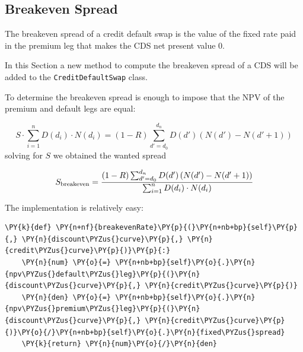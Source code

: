\subsection{Breakeven Spread}
The breakeven spread of a credit default swap is the value of the fixed rate paid in the premium leg that makes the CDS net present value 0.

In this Section a new method to compute the breakeven spread of a CDS will be added to the \texttt{CreditDefaultSwap} class.

To determine the breakeven spread is enough to impose that the NPV of the premium and default legs are equal:

\[
S \cdot\sum_{i=1}^{n} D(d_i) \cdot N(d_i)
= (1-R) \sum_{d'=d_0}^{d_n} D(d') \left( N(d') - N(d'+1) \right)
\]
solving for $S$ we obtained the wanted spread

\[
S_{\mathrm{breakeven}} = \cfrac{(1-R) \sum_{d'=d_0}^{d_n} D(d') \left( N(d') - N(d'+1) \right)}{\sum_{i=1}^{n} D(d_i) \cdot N(d_i)}
\]

The implementation is relatively easy:

\begin{tcolorbox}[breakable, size=fbox, boxrule=1pt, pad at break*=1mm,colback=cellbackground, colframe=cellborder]
\begin{Verbatim}[commandchars=\\\{\}]
  \PY{k}{def} \PY{n+nf}{breakevenRate}\PY{p}{(}\PY{n+nb+bp}{self}\PY{p}{,} \PY{n}{discount\PYZus{}curve}\PY{p}{,} \PY{n}{credit\PYZus{}curve}\PY{p}{)}\PY{p}{:}
    \PY{n}{num} \PY{o}{=} \PY{n+nb+bp}{self}\PY{o}{.}\PY{n}{npv\PYZus{}default\PYZus{}leg}\PY{p}{(}\PY{n}{discount\PYZus{}curve}\PY{p}{,} \PY{n}{credit\PYZus{}curve}\PY{p}{)}
    \PY{n}{den} \PY{o}{=} \PY{n+nb+bp}{self}\PY{o}{.}\PY{n}{npv\PYZus{}premium\PYZus{}leg}\PY{p}{(}\PY{n}{discount\PYZus{}curve}\PY{p}{,} \PY{n}{credit\PYZus{}curve}\PY{p}{)}\PY{o}{/}\PY{n+nb+bp}{self}\PY{o}{.}\PY{n}{fixed\PYZus{}spread}
    \PY{k}{return} \PY{n}{num}\PY{o}{/}\PY{n}{den}
\end{Verbatim}
\end{tcolorbox}























